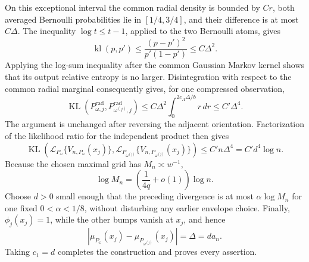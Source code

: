 On this exceptional interval the common radial density is bounded by \(Cr\), both averaged Bernoulli probabilities lie in \([1/4,3/4]\), and their difference is at most \(C\Delta\).  The inequality \(\log t\leq t-1\), applied to the two Bernoulli atoms, gives
\[
 \operatorname{kl}(p,p')
 \leq\frac{(p-p')^2}{p'(1-p')}
 \leq C\Delta^2.
\]
Applying the log-sum inequality after the common Gaussian Markov kernel shows that its output relative entropy is no larger.  Disintegration with respect to the common radial marginal consequently gives, for one compressed observation,
\[
 \operatorname{KL}(P^{\mathrm{rad}}_{\omega,j},P^{\mathrm{rad}}_{\omega^{(j)},j})
 \leq C\Delta^2\int_0^{2c_A\Delta/b}r\,dr
 \leq C'\Delta^4.
\]
The argument is unchanged after reversing the adjacent orientation.  Factorization of the likelihood ratio for the independent product then gives
\[
 \operatorname{KL}\!\left(
 \mathcal L_{P_\omega}\{V_{n,P_\omega}(x_j)\},
 \mathcal L_{P_{\omega^{(j)}}}\{V_{n,P_{\omega^{(j)}}}(x_j)\}
 \right)
 \leq C'n\Delta^4=C'd^4\log n.
\]
Because the chosen maximal grid has \(M_n\asymp w^{-1}\),
\[
 \log M_n=\left(\frac{1}{4q}+o(1)\right)\log n.
\]
Choose \(d>0\) small enough that the preceding divergence is at most \(\alpha\log M_n\) for one fixed \(0<\alpha<1/8\), without disturbing any earlier envelope choice.  Finally, \(\phi_j(x_j)=1\), while the other bumps vanish at \(x_j\), and hence
\[
 |\mu_{P_\omega}(x_j)-\mu_{P_{\omega^{(j)}}}(x_j)|
 =\Delta=d a_n.
\]
Taking \(c_1=d\) completes the construction and proves every assertion.